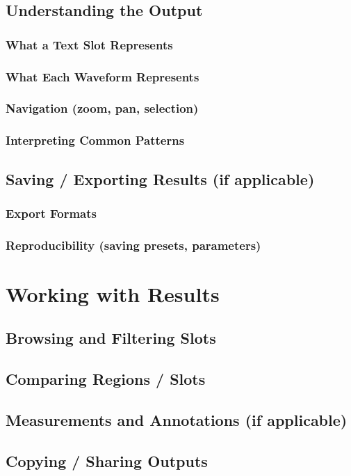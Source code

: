 \documentclass[11pt]{report}
\begin{document}
    \section{Understanding the Output}
    \subsection{What a Text Slot Represents}
    \subsection{What Each Waveform Represents}
    \subsection{Navigation (zoom, pan, selection)}
    \subsection{Interpreting Common Patterns}
    \section{Saving / Exporting Results (if applicable)}
    \subsection{Export Formats}
    \subsection{Reproducibility (saving presets, parameters)}
    
    \chapter{Working with Results}
    \section{Browsing and Filtering Slots}
    \section{Comparing Regions / Slots}
    \section{Measurements and Annotations (if applicable)}
    \section{Copying / Sharing Outputs}
    
\end{document}
